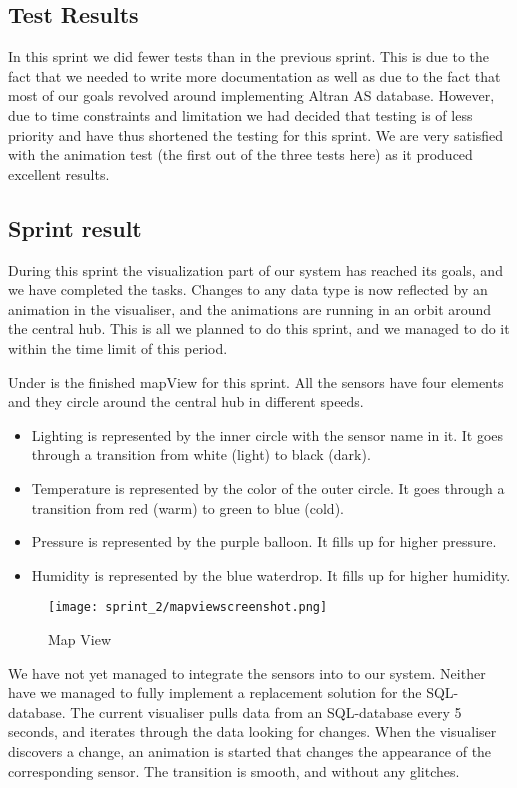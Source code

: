 \documentclass[../document]{subfiles}
\begin{document}
\subsection{Test Results}
In this sprint we did fewer tests than in the previous sprint. This is due to the fact that we needed to write more documentation as well as due to the fact that most of our goals revolved around implementing Altran AS database. However, due to time constraints and limitation we had decided that testing is of less priority and have thus shortened the testing for this sprint. We are very satisfied with the animation test (the first out of the three tests here) as it produced excellent results.

\subsection{Sprint result}
During this sprint the visualization part of our system has reached its goals, and we have completed the tasks. Changes to any data type is now reflected by an animation in the visualiser, and the animations are running in an orbit around the central hub. This is all we planned to do this sprint, and we managed to do it within the time limit of this period. 

Under is the finished mapView for this sprint. All the sensors have four elements and they circle around the central hub in different speeds.

\begin{itemize}
\item
Lighting is represented by the inner circle with the sensor name in it. It goes through a transition from white (light) to black (dark).
\item
Temperature is represented by the color of the outer circle. It goes through a transition from red (warm) to green to blue (cold).
\item
Pressure is represented by the purple balloon. It fills up for higher pressure.
\item
Humidity is represented by the blue waterdrop. It fills up for higher humidity.
\end{itemize}

\begin{figure}[H]
	\centering
	\texttt{[image: sprint\_2/mapviewscreenshot.png]}
	\caption{Map View}
\end{figure}

We have not yet managed to integrate the sensors into to our system. Neither have we managed to fully implement a replacement solution for the SQL-database. The current visualiser pulls data from an SQL-database every 5 seconds, and iterates through the data looking for changes. When the visualiser discovers a change, an animation is started that changes the appearance of the corresponding sensor. The transition is smooth, and without any glitches.
\end{document}
